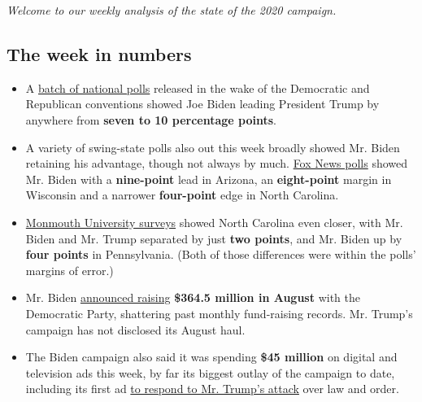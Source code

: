 \emph{Welcome to our weekly analysis of the state of the 2020 campaign.}

\hypertarget{the-week-in-numbers}{%
\subsection{The week in numbers}\label{the-week-in-numbers}}

\begin{itemize}
\item
  A
  \href{https://www.nytimes3xbfgragh.onion/2020/09/03/us/politics/biden-trump-polling.html}{batch
  of national polls} released in the wake of the Democratic and
  Republican conventions showed Joe Biden leading President Trump by
  anywhere from \textbf{seven to 10 percentage points}.
\item
  A variety of swing-state polls also out this week broadly showed Mr.
  Biden retaining his advantage, though not always by much.
  \href{https://www.foxnews.com/official-polls/fox-news-poll-biden-tops-trump-among-likely-voters-in-key-states}{Fox
  News polls} showed Mr. Biden with a \textbf{nine-point} lead in
  Arizona, an \textbf{eight-point} margin in Wisconsin and a narrower
  \textbf{four-point} edge in North Carolina.
\item
  \href{https://www.monmouth.edu/polling-institute/reports/}{Monmouth
  University surveys} showed North Carolina even closer, with Mr. Biden
  and Mr. Trump separated by just \textbf{two points}, and Mr. Biden up
  by \textbf{four points} in Pennsylvania. (Both of those differences
  were within the polls' margins of error.)
\item
  Mr. Biden
  \href{https://www.nytimes3xbfgragh.onion/live/2020/09/02/us/trump-vs-biden\#biden-shatters-fund-raising-records-with-a-364-5-million-haul-in-august}{announced
  raising} \textbf{\$364.5 million in August} with the Democratic Party,
  shattering past monthly fund-raising records. Mr. Trump's campaign has
  not disclosed its August haul.
\end{itemize}

\begin{itemize}
\tightlist
\item
  The Biden campaign also said it was spending \textbf{\$45 million} on
  digital and television ads this week, by far its biggest outlay of the
  campaign to date, including its first ad
  \href{https://www.nytimes3xbfgragh.onion/2020/09/02/us/politics/biden-ads-trump.html}{to
  respond to Mr. Trump's attack} over law and order.
\end{itemize}

